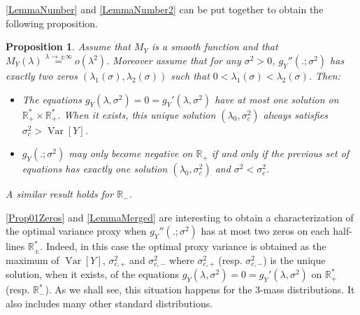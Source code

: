 \documentclass[a4paper, 10pt]{article}
\newtheorem{proposition}{Proposition}[section]
\newtheorem{lemma}{Lemma}[section]
\theoremstyle{definition}
\begin{document}
 \autoref{LemmaNumber} and \autoref{LemmaNumber2} can be put together to obtain the following proposition.

\begin{proposition}\label{LemmaMerged}Assume that $M_Y$ is a smooth function and that $M_Y(\lambda)\overset{\lambda\to \pm\infty}{=}o(\lambda^2)$. Moreover assume that for any $\sigma^2>0$, $g_Y''(.;\sigma^2)$ has exactly two zeros $(\lambda_1(\sigma),\lambda_2(\sigma))$ such that $0<\lambda_1(\sigma)<\lambda_2(\sigma)$. Then:
\begin{itemize}
    \item The equations $g_Y(\lambda,\sigma^2)=0=g_Y'(\lambda,\sigma^2)$ have at most one solution on $\mathbb{R}_+^*\times  \mathbb{R}_+^*$. When it exists, this unique solution $(\lambda_0,\sigma_c^2)$ always satisfies $\sigma_c^2>\operatorname{Var}[Y]$.
    \item $g_Y(.;\sigma^2)$ may only become negative on $\mathbb{R}_+$ if and only if the previous set of equations has exactly one solution $(\lambda_0,\sigma_c^2)$  and $\sigma^2< \sigma_c^2$.
\end{itemize}
A similar result holds for $\mathbb{R}_-$.
\end{proposition}

\autoref{Prop01Zeros} and \autoref{LemmaMerged} are interesting to obtain a characterization of the optimal variance proxy when $g_Y''(.;\sigma^2)$ has at most two zeros on each half-lines $\mathbb{R}_\pm^*$. Indeed, in this case the optimal proxy variance is obtained as the maximum of $\operatorname{Var}[Y]$, $\sigma_{c,+}^2$ and $\sigma_{c,-}^2$ where $\sigma_{c,+}^2$ (resp. $\sigma_{c,-}^2$) is the unique solution, when it exists, of the equations $g_Y(\lambda,\sigma^2)=0=g_Y'(\lambda,\sigma^2)$ on $\mathbb{R}_+^*$ (resp. $\mathbb{R}_-^*$). As we shall see, this situation happens for the $3$-mass distributions. It also includes many other standard distributions.

\end{document}
